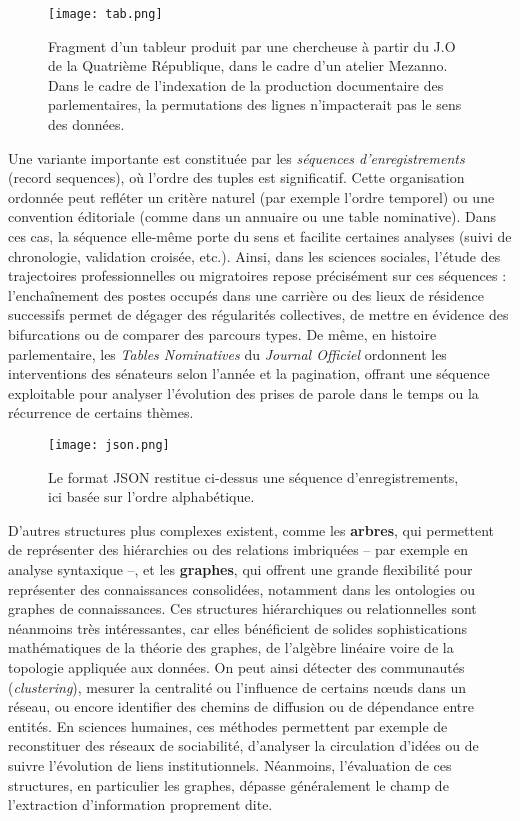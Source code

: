 \begin{figure}[htbp]
\centering
\texttt{[image: tab.png]}
\caption{Fragment d'un tableur produit par une chercheuse à partir du J.O de la Quatrième République, dans le cadre d'un atelier Mezanno. Dans le cadre de l'indexation de la production documentaire des parlementaires, la permutations des lignes n'impacterait pas le sens des données.}
\label{fig:tab}
\end{figure}

Une variante importante est constituée par les \emph{séquences d’enregistrements} (record sequences), où l’ordre des tuples est significatif. Cette organisation ordonnée peut refléter un critère naturel (par exemple l’ordre temporel) ou une convention éditoriale (comme dans un annuaire ou une table nominative). Dans ces cas, la séquence elle-même porte du sens et facilite certaines analyses (suivi de chronologie, validation croisée, etc.). Ainsi, dans les sciences sociales, l’étude des trajectoires professionnelles ou migratoires repose précisément sur ces séquences : l’enchaînement des postes occupés dans une carrière ou des lieux de résidence successifs permet de dégager des régularités collectives, de mettre en évidence des bifurcations ou de comparer des parcours types. De même, en histoire parlementaire, les \emph{Tables Nominatives} du \emph{Journal Officiel} ordonnent les interventions des sénateurs selon l’année et la pagination, offrant une séquence exploitable pour analyser l’évolution des prises de parole dans le temps ou la récurrence de certains thèmes.

\begin{figure}[htbp]
\centering
\texttt{[image: json.png]}
\caption{Le format JSON restitue ci-dessus une séquence d'enregistrements, ici basée sur l'ordre alphabétique.}
\label{fig:json}
\end{figure}

D’autres structures plus complexes existent, comme les \textbf{arbres}, qui permettent de représenter des hiérarchies ou des relations imbriquées -- par exemple en analyse syntaxique --, et les \textbf{graphes}, qui offrent une grande flexibilité pour représenter des connaissances consolidées, notamment dans les ontologies ou graphes de connaissances. Ces structures hiérarchiques ou relationnelles sont néanmoins très intéressantes, car elles bénéficient de solides sophistications mathématiques de la théorie des graphes, de l'algèbre linéaire voire de la topologie appliquée aux données. On peut ainsi détecter des communautés (\emph{clustering}), mesurer la centralité ou l’influence de certains nœuds dans un réseau, ou encore identifier des chemins de diffusion ou de dépendance entre entités. En sciences humaines, ces méthodes permettent par exemple de reconstituer des réseaux de sociabilité, d’analyser la circulation d’idées ou de suivre l’évolution de liens institutionnels. Néanmoins, l’évaluation de ces structures, en particulier les graphes, dépasse généralement le champ de l’extraction d’information proprement dite.


